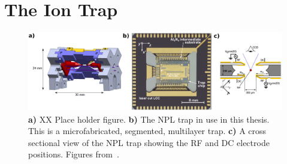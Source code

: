 \section{The Ion Trap}
\label{sec:The Ion Trap}

    \begin{figure}
        \begin{center}
        \noindent\includegraphics[width=\linewidth]{figures/png_figure/trap_comp.png}
        \end{center}
        \caption{\textbf{a)} XX Place holder figure. \textbf{b)} The NPL trap in use in this thesis. This is a microfabricated,
        segmented, multilayer trap. \textbf{c)} A cross sectional view of
        the NPL trap showing the RF and DC electrode positions.  Figures
        from~\cite{choonee_silicon_2017}.
        \label{fig:trap}}
    \end{figure}

